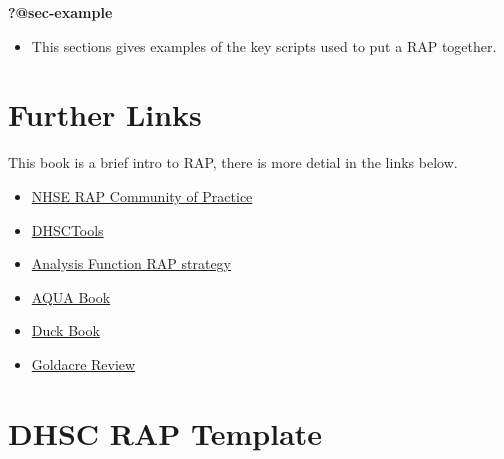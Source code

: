 \documentclass[
  letterpaper,
]{book}
\providecommand{\tightlist}{%
  \setlength{\itemsep}{0pt}\setlength{\parskip}{0pt}}\usepackage{longtable,booktabs,array}
\begin{document}
\textbf{?@sec-example}

\begin{itemize}
\tightlist
\item
  This sections gives examples of the key scripts used to put a RAP
  together.
\end{itemize}


\hypertarget{further-links}{%
\chapter{Further Links}\label{further-links}}

This book is a brief intro to RAP, there is more detial in the links
below.

\begin{itemize}
\item
  \href{https://nhsdigital.github.io/rap-community-of-practice/}{NHSE
  RAP Community of Practice}
\item
  \href{https://github.com/DataS-DHSC/DHSCtools}{DHSCTools}
\item
  \href{https://analysisfunction.civilservice.gov.uk/policy-store/reproducible-analytical-pipelines-strategy/}{Analysis
  Function RAP strategy}
\item
  \href{https://www.gov.uk/government/publications/the-aqua-book-guidance-on-producing-quality-analysis-for-government}{AQUA
  Book}
\item
  \href{https://best-practice-and-impact.github.io/qa-of-code-guidance/intro.html}{Duck
  Book}
\item
  \href{https://www.gov.uk/government/publications/better-broader-safer-using-health-data-for-research-and-analysis}{Goldacre
  Review}
\end{itemize}


\hypertarget{sec-template}{%
\chapter{DHSC RAP Template}\label{sec-template}}
\end{document}
